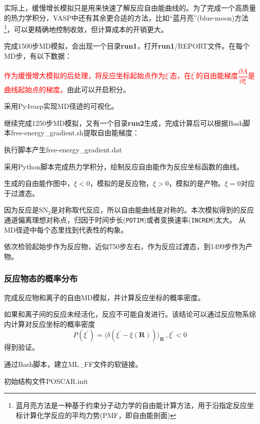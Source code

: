 实际上，缓慢增长模拟只是用来快速了解反应自由能曲线的。为了完成一个高质量的热力学积分，\textrm{VASP}中还有其余更合适的方法，比如``蓝月亮''\textrm{(blue-moon)}方法\footnote{蓝月亮方法是一种基于约束分子动力学的自由能计算方法，用于沿指定反应坐标计算化学反应的平均力势(\textrm{PMF}，即自由能剖面)}，可以更精确地控制收敛，但计算成本的开销更大。

完成1500步\textrm{MD}模拟，会出现一个目录\textbf{run1}，打开\textbf{run1}\textrm{/REPORT}文件。在每个\textrm{MD}步，有以下数据：

\textcolor{red}{作为缓慢增大模拟的后处理，将反应坐标起始点作为${\xi^{\prime}}$态，在$\xi^{\prime}$的自由能梯度$\dfrac{\partial A}{\partial\xi}$是曲线起始点的梯度。}由此可以开启积分。

采用\textrm{Py4vasp}实现\textrm{MD}径迹的可视化。

继续完成1250步\textrm{MD}模拟，又有一个目录\textbf{run2}生成，完成计算后可以根据\textrm{Bash}脚本\textrm{free-energy\_gradient.sh}提取自由能梯度：

执行脚本产生\textrm{free-energy\_gradient.dat}

采用\textrm{Python}脚本完成热力学积分，绘制反应自由能作为反应坐标函数的曲线。

生成的自由能作图中，$\xi<0$，模拟的是反应物，$\xi>0$，模拟的是产物。$\xi=0$对应于过渡态。

因为反应是$\mathrm{SN}_2$是对称取代反应，所以自由能曲线是对称的。本次模拟得到的反应通道偏离理想对称点，归因于时间步长(\texttt{POTIM})或者变换速率(\texttt{INCREM})太大。
从\textrm{MD}径迹中每个态里找到代表性的构象。

依次检验起始步作为反应物，近似750步左右，作为反应过渡态，到1499步作为产物。
\subsubsection{反应物态的概率分布}
完成反应物和离子的自由\textrm{MD}模拟，并计算反应坐标的概率密度。

如果和离子间的反应未经活化，反应不可能自发进行。该结论可以通过反应物系综内计算对反应坐标的概率密度
\begin{displaymath}
	P(\xi^{\prime})=\langle\delta(\xi^{\prime}-\xi(\mathbf{R}))\rangle_{\mathbf{R}^{\prime}}, \xi^{\prime}<0
\end{displaymath}
得到验证。

通过\textrm{Bash}脚本，建立\textrm{ML\_FF}文件的软链接。

初始结构文件\textrm{POSCAR.init}

